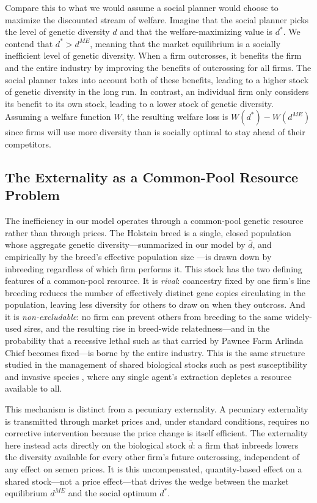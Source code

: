 \documentclass[12pt,letterpaper]{article}
\begin{document}
Compare this to what we would assume a social planner would choose to maximize the discounted stream of welfare.
Imagine that the social planner picks the level of genetic diversity $d$ and that the welfare-maximizing value is $d^*$.
We contend that $d^*>d^{ME}$, meaning that the market equilibrium is a socially inefficient level of genetic diversity.
When a firm outcrosses, it benefits the firm and the entire industry by improving the benefits of outcrossing for all firms.
The social planner takes into account both of these benefits, leading to a higher stock of genetic diversity in the long run.
In contrast, an individual firm only considers its benefit to its own stock, leading to a lower stock of genetic diversity.
Assuming a welfare function $W$, the resulting welfare loss is $W(d^*)-W(d^{ME})$ since firms will use more diversity than is socially optimal to stay ahead of their competitors.

\subsection{The Externality as a Common-Pool Resource Problem}

The inefficiency in our model operates through a common-pool genetic resource rather than through prices. The Holstein breed is a single, closed population whose aggregate genetic diversity---summarized in our model by $\bar{d}$, and empirically by the breed's effective population size \citep{Makanjuola2020}---is drawn down by inbreeding regardless of which firm performs it. This stock has the two defining features of a common-pool resource. It is \emph{rival}: coancestry fixed by one firm's line breeding reduces the number of effectively distinct gene copies circulating in the population, leaving less diversity for others to draw on when they outcross. And it is \emph{non-excludable}: no firm can prevent others from breeding to the same widely-used sires, and the resulting rise in breed-wide relatedness---and in the probability that a recessive lethal such as that carried by Pawnee Farm Arlinda Chief \citep{Adams2016} becomes fixed---is borne by the entire industry. This is the same structure studied in the management of shared biological stocks such as pest susceptibility and invasive species \citep{epanchin2015individual}, where any single agent's extraction depletes a resource available to all.

This mechanism is distinct from a pecuniary externality. A pecuniary externality is transmitted through market prices and, under standard conditions, requires no corrective intervention because the price change is itself efficient. The externality here instead acts directly on the biological stock $\bar{d}$: a firm that inbreeds lowers the diversity available for every other firm's future outcrossing, independent of any effect on semen prices. It is this uncompensated, quantity-based effect on a shared stock---not a price effect---that drives the wedge between the market equilibrium $d^{ME}$ and the social optimum $d^{*}$.
\end{document}
